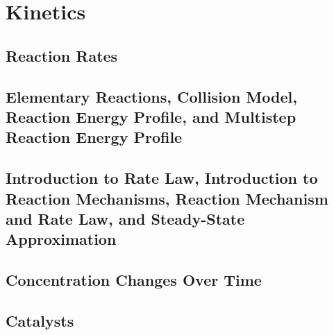\documentclass[../chem.tex]{subfiles}
\begin{document}
\chapter{Kinetics}
\section{Reaction Rates}
\section{Elementary Reactions, Collision Model, Reaction Energy Profile, and Multistep Reaction Energy Profile}
\section{Introduction to Rate Law, Introduction to Reaction Mechanisms, Reaction Mechanism and Rate Law, and Steady-State Approximation}
\section{Concentration Changes Over Time}
\section{Catalysts}
\end{document}
